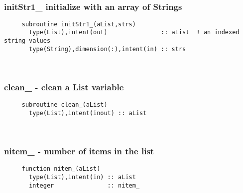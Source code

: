 \mbox{}\hrulefill\ 
 
  \subsubsection{initStr1\_ initialize with an array of Strings}

\begin{verbatim} 
     subroutine initStr1_(aList,strs)
       type(List),intent(out)               :: aList  ! an indexed string values
       type(String),dimension(:),intent(in) :: strs
 \end{verbatim} %
 
 
\mbox{}\hrulefill\ 
 

  \subsubsection{clean\_ - clean a List variable}

\begin{verbatim} 
     subroutine clean_(aList)
       type(List),intent(inout) :: aList
 \end{verbatim} %
 
 
\mbox{}\hrulefill\ 
 
\subsubsection{nitem\_ - number of items in the list}

\begin{verbatim} 
     function nitem_(aList)
       type(List),intent(in) :: aList
       integer               :: nitem_
 \end{verbatim} %
 
